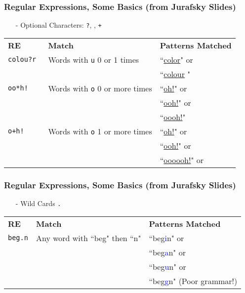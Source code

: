  \begin{frame}[fragile]
\frametitle{Regular Expressions, Some Basics (from Jurafsky Slides) } 
\begin{itemize}
\item[-] Optional Characters: {\tt ?}, {\tt *}, {\tt +} 
\end{itemize}
\begin{center}
\begin{tabular}{lll}
\textbf{RE} & \textbf{Match} & \textbf{Patterns Matched}\\
{\tt colou?r } &  Words with {\tt u}  0 or 1 times& ``\underline{color}"  or \\
                   &                                & ``\underline{colour} " \\
{\tt oo*h!}     & Words with {\tt o}  0 or more times & ``\underline{oh!}" or \\
                      &                                                   &   ``\underline{ooh!}" or \\
                       &                                                   &   ``\underline{oooh!}" \\ 
{\tt o+h!} &   Words with {\tt o} 1 or more times & ``\underline{oh!}" or \\
  &                                                   &   ``\underline{ooh!}" or \\
    &                                                   &   ``\underline{oooooh!}" or \\                       
\end{tabular}
\end{center}
\end{frame}

 \begin{frame}[fragile]
\frametitle{Regular Expressions, Some Basics (from Jurafsky Slides) } 
\begin{itemize}
\item[-] Wild Cards \alert{{\tt .} } 
\end{itemize}
\begin{center}
\begin{tabular}{lll}
\textbf{RE} & \textbf{Match} & \textbf{Patterns Matched}\\
{\tt beg\alert{.}n} & Any word with ``beg" then ``n" & ``beg\textcolor{blue}{i}n" or \\
                          &                                            &  ``beg\textcolor{blue}{a}n" or \\
                          &                                            &  ``beg\textcolor{blue}{u}n" or \\
                          &                                            &  ``beg\textcolor{blue}{g}n" (Poor grammar!) 
                          
 \end{tabular}
 \end{center}
 
 \end{frame}

